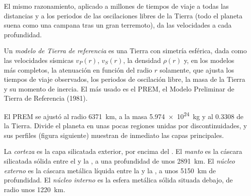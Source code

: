 El mismo razonamiento, aplicado a millones de tiempos de viaje a todas las distancias y a los periodos de las oscilaciones
libres de la Tierra (todo el planeta suena como una campana tras un gran terremoto), da las velocidades a cada profundidad.

\begin{definition}\label{def:b1:layered-earth:reference-model}
Un \emph{modelo de Tierra de referencia} es una Tierra con simetría esférica, dada
como las velocidades sísmicas $v_P(r)$, $v_S(r)$, la densidad $\rho(r)$ y, en los modelos más completos, la atenuación en
función del radio $r$ solamente, que ajusta los tiempos de viaje observados, los periodos de oscilación libre, la masa de la
Tierra y su momento de inercia. El más usado es el PREM, el Modelo Preliminar de Tierra de Referencia (1981).
\end{definition}

El PREM se ajustó al radio \qty{6371}{km}, a la masa \qty{5.974e24}{kg} y al  $0.3308$ de la
Tierra. Divide el planeta en unas pocas regiones unidas por discontinuidades, y sus perfiles (figura siguiente) muestran de
inmediato las capas principales.

\begin{definition}\label{def:b1:layered-earth:layers}
La \emph{corteza} es la capa silicatada exterior, por encima del . El
\emph{manto} es la cáscara silicatada sólida entre el  y la , a una profundidad de
unos \qty{2891}{km}. El \emph{núcleo externo} es la cáscara metálica líquida entre la  y la , a unos \qty{5150}{km} de profundidad. El \emph{núcleo interno} es la esfera metálica sólida situada debajo, de radio unos \qty{1220}{km}.
\end{definition}

